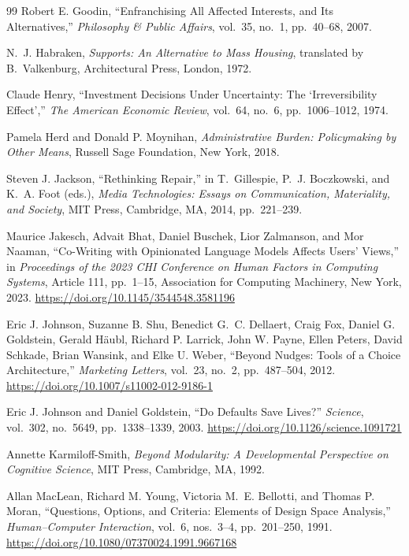 \begin{thebibliography}{99}
Robert E. Goodin,
``Enfranchising All Affected Interests, and Its Alternatives,''
\textit{Philosophy \& Public Affairs},
vol.~35, no.~1, pp.~40--68, 2007.

N.~J. Habraken,
\textit{Supports: An Alternative to Mass Housing},
translated by B.~Valkenburg,
Architectural Press, London, 1972.

Claude Henry,
``Investment Decisions Under Uncertainty: The `Irreversibility Effect',''
\textit{The American Economic Review},
vol.~64, no.~6, pp.~1006--1012, 1974.

Pamela Herd and Donald P. Moynihan,
\textit{Administrative Burden: Policymaking by Other Means},
Russell Sage Foundation, New York, 2018.

Steven J. Jackson,
``Rethinking Repair,''
in T.~Gillespie, P.~J. Boczkowski, and K.~A. Foot (eds.),
\textit{Media Technologies: Essays on Communication, Materiality, and Society},
MIT Press, Cambridge, MA, 2014, pp.~221--239.

Maurice Jakesch, Advait Bhat, Daniel Buschek, Lior Zalmanson,
and Mor Naaman,
``Co-Writing with Opinionated Language Models Affects Users' Views,''
in \textit{Proceedings of the 2023 CHI Conference on Human Factors
in Computing Systems},
Article 111, pp.~1--15,
Association for Computing Machinery, New York, 2023.
\url{https://doi.org/10.1145/3544548.3581196}

Eric J. Johnson, Suzanne B. Shu, Benedict G.~C. Dellaert, Craig Fox,
Daniel G. Goldstein, Gerald H\"aubl, Richard P. Larrick, John W. Payne,
Ellen Peters, David Schkade, Brian Wansink, and Elke U. Weber,
``Beyond Nudges: Tools of a Choice Architecture,''
\textit{Marketing Letters},
vol.~23, no.~2, pp.~487--504, 2012.
\url{https://doi.org/10.1007/s11002-012-9186-1}

Eric J. Johnson and Daniel Goldstein,
``Do Defaults Save Lives?''
\textit{Science},
vol.~302, no.~5649, pp.~1338--1339, 2003.
\url{https://doi.org/10.1126/science.1091721}

Annette Karmiloff-Smith,
\textit{Beyond Modularity: A Developmental Perspective on Cognitive
Science},
MIT Press, Cambridge, MA, 1992.

Allan MacLean, Richard M. Young, Victoria M.~E. Bellotti, and Thomas P. Moran,
``Questions, Options, and Criteria: Elements of Design Space Analysis,''
\textit{Human--Computer Interaction},
vol.~6, nos.~3--4, pp.~201--250, 1991.
\url{https://doi.org/10.1080/07370024.1991.9667168}


\end{thebibliography}
